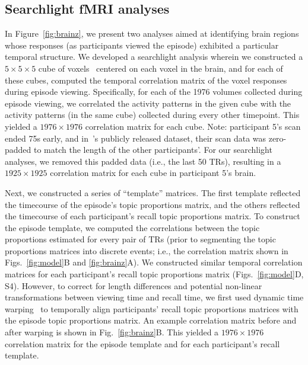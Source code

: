 \documentclass[10pt]{article}
\newcommand{\corrmats}{S4}
\begin{document}
\subsection*{Searchlight fMRI analyses}
In Figure~\ref{fig:brainz}, we present two analyses aimed at identifying brain regions whose responses (as participants viewed the episode) exhibited a particular temporal structure.  We developed a searchlight analysis wherein we constructed a $5 \times 5 \times 5$ cube of voxels~\citep[following][]{ChenEtal17} centered on each voxel in the brain, and for each of these cubes, computed the temporal correlation matrix of the voxel responses during episode viewing.  Specifically, for each of the 1976 volumes collected during episode viewing, we correlated the activity patterns in the given cube with the activity patterns (in the same cube) collected during every other timepoint.  This yielded a $1976 \times 1976$ correlation matrix for each cube.  Note: participant 5's scan ended 75s early, and in~\cite{ChenEtal17}'s publicly released dataset, their scan data was zero-padded to match the length of the other participants'.  For our searchlight analyses, we removed this padded data (i.e., the last 50 TRs), resulting in a $1925 \times 1925$ correlation matrix for each cube in participant 5's brain.

Next, we constructed a series of ``template'' matrices.  The first template reflected the timecourse of the episode's topic proportions matrix, and the others reflected the timecourse of each participant's recall topic proportions matrix.  To construct the episode template, we computed the correlations between the topic proportions estimated for every pair of TRs (prior to segmenting the topic proportions matrices into discrete events; i.e., the correlation matrix shown in Figs.~\ref{fig:model}B and \ref{fig:brainz}A).  We constructed similar temporal correlation matrices for each participant's recall topic proportions matrix (Figs.~\ref{fig:model}D, \corrmats).  However, to correct for length differences and potential non-linear transformations between viewing time and recall time, we first used dynamic time warping~\citep{BernClif94} to temporally align participants' recall topic proportions matrices with the episode topic proportions matrix.  An example correlation matrix before and after warping is shown in Fig.~\ref{fig:brainz}B.  This yielded a $1976 \times 1976$ correlation matrix for the episode template and for each participant's recall template.
\end{document}
